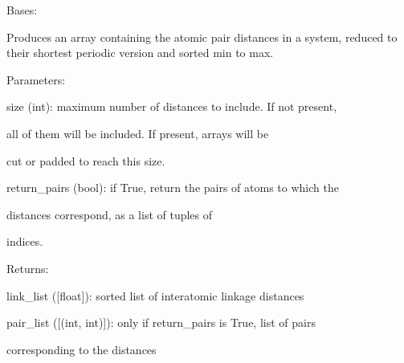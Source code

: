 \documentclass[letterpaper,10pt,english]{sphinxmanual}
\begin{document}
\begin{fulllineitems}
\label{doctree/soprano.properties.linkage.linkage:soprano.properties.linkage.linkage.LinkageList}
Bases: {\hyperref[doctree/soprano.properties.atomsproperty:soprano.properties.atomsproperty.AtomsProperty]{}}

Produces an array containing the atomic pair distances in a system,
reduced to their shortest periodic version and sorted min to max.

\begin{DUlineblock}{0em}
\item[] Parameters:
\item[]
\begin{DUlineblock}{\DUlineblockindent}
\item[] size (int): maximum number of distances to include. If not present,
\item[]
\begin{DUlineblock}{\DUlineblockindent}
\item[] all of them will be included. If present, arrays will be
\item[] cut or padded to reach this size.
\end{DUlineblock}
\item[] return\_pairs (bool): if True, return the pairs of atoms to which the
\item[]
\begin{DUlineblock}{\DUlineblockindent}
\item[] distances correspond, as a list of tuples of
\item[] indices.
\end{DUlineblock}
\end{DUlineblock}
\end{DUlineblock}

\begin{DUlineblock}{0em}
\item[] Returns:
\item[]
\begin{DUlineblock}{\DUlineblockindent}
\item[] link\_list ({[}float{]}): sorted list of interatomic linkage distances
\item[] pair\_list ({[}(int, int){]}): only if return\_pairs is True, list of pairs
\item[]
\begin{DUlineblock}{\DUlineblockindent}
\item[] corresponding to the distances
\end{DUlineblock}
\end{DUlineblock}
\end{DUlineblock}


\end{fulllineitems}
\end{document}
